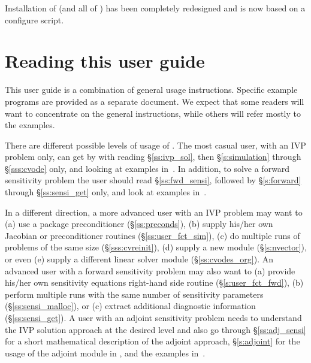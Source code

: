 Installation of {\cvodes} (and all of {\sundials}) has been completely 
redesigned and is now based on a configure script.


\section{Reading this user guide}\label{ss:reading}

This user guide is a combination of general usage instructions.
Specific example programs are provided as a separate document.
We expect that some readers will want to concentrate on the general 
instructions, while others will refer mostly to the examples.

There are different possible levels of usage of {\cvodes}. The most casual
user, with an IVP problem only, can get by with reading \S\ref{ss:ivp_sol}, 
then \S\ref{s:simulation} through \S\ref{sss:cvode} only, and looking at examples 
in~\cite{cvodes2.3.0_ex}.
In addition, to solve a forward sensitivity problem the user should read 
\S\ref{ss:fwd_sensi}, followed by \S\ref{s:forward} through 
\S\ref{ss:sensi_get} only, and look at examples in~\cite{cvodes2.3.0_ex}.

In a different direction, a more advanced user with an IVP problem may want to 
(a) use a package preconditioner (\S\ref{ss:preconds}), 
(b) supply his/her own Jacobian or preconditioner routines (\S\ref{ss:user_fct_sim}),
(c) do multiple runs of problems of the same size (\S\ref{sss:cvreinit}), 
(d) supply a new {\nvector} module (\S\ref{s:nvector}), or even 
(e) supply a different linear solver module (\S\ref{ss:cvodes_org}).
%
An advanced user with a forward sensitivity problem may also want to
(a) provide his/her own sensitivity equations right-hand side routine
(\S\ref{s:user_fct_fwd}), (b) perform multiple runs with the same number of
sensitivity parameters (\S\ref{ss:sensi_malloc}), or (c) extract additional
diagnostic information (\S\ref{ss:sensi_get}).
%
A user with an adjoint sensitivity problem needs to understand the IVP 
solution approach at the desired level and also go through 
\S\ref{ss:adj_sensi} for a short mathematical description of the adjoint
approach, \S\ref{s:adjoint} for the usage of the adjoint module in {\cvodes},
and the examples in~\cite{cvodes2.3.0_ex}.

